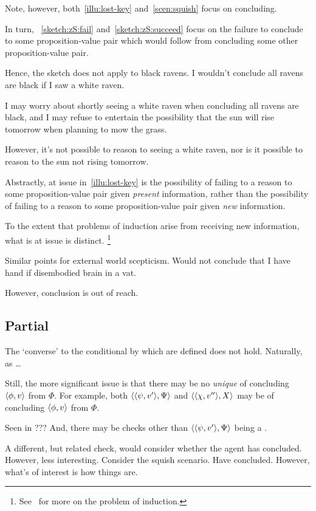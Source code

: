 \begin{note}
  Note, however, both~\autoref{illu:lost-key} and~\autoref{scen:squish} focus on concluding.

  In turn, ~\ref{sketch:zS:fail} and~\ref{sketch:zS:succeed} focus on the failure to conclude to some proposition-value pair which would follow from concluding some other proposition-value pair.

  Hence, the sketch does not apply to black ravens.
  I wouldn't conclude all ravens are black if I saw a white raven.

  I may worry about shortly seeing a white raven when concluding all ravens are black, and I may refuse to entertain the possibility that the sun will rise tomorrow when planning to mow the grass.

  However, it's not possible to reason to seeing a white raven, nor is it possible to reason to the sun not rising tomorrow.

  Abstractly, at issue in~\autoref{illu:lost-key} is the possibility of failing to a reason to some proposition-value pair given \emph{present} information, rather than the possibility of failing to a reason to some proposition-value pair given \emph{new} information.

  To the extent that problems of induction arise from receiving new information, what is at issue is distinct.%
  \footnote{
    See~\textcite{Henderson:2020wb} for more on the problem of induction.
  }

  Similar points for external world scepticism.
  Would not conclude that I have hand if disembodied brain in a vat.

  However, conclusion is out of reach.
\end{note}

\subsection{Partial}

\begin{note}
  The `converse' to the conditional by which  are defined does not hold.
  Naturally, as \fc{}\dots

  Still, the more significant issue is that there may be no \emph{unique}  of concluding \(\langle \phi, v \rangle\) from \(\Phi\).
  For example, both \(\langle \langle \psi, v' \rangle, \Psi \rangle\) and \(\langle \langle \chi, v'' \rangle, X \rangle\) may be  of concluding \(\langle \phi, v \rangle\) from \(\Phi\).

  {
    \color{red}
    Seen in ???
  }
  And, there may be checks other than \(\langle \langle \psi, v' \rangle, \Psi \rangle\) being a \curb{}.

  A different, but related check, would consider whether the agent has concluded.
  However, less interesting.
  Consider the squish scenario.
  Have concluded.
  However, what's of interest is how things are.
\end{note}

